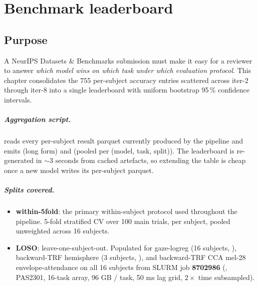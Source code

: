 \chapter{Benchmark leaderboard}
\label{ch:benchmark}

\section{Purpose}

A NeurIPS Datasets \& Benchmarks submission must make it easy for a
reviewer to answer \emph{which model wins on which task under which
evaluation protocol}. This chapter consolidates the 755 per-subject
accuracy entries scattered across iter-2 through iter-8 into a single
leaderboard with uniform bootstrap 95\,\% confidence intervals.

\paragraph{Aggregation script.}
 reads every
per-subject result parquet currently produced by the pipeline and emits
 (long form) and
 (pooled per
(model, task, split)). The leaderboard is re-generated in $\sim 3$
seconds from cached artefacts, so extending the table is cheap once a
new model writes its per-subject parquet.

\paragraph{Splits covered.}
\begin{itemize}
  \item \textbf{within-5fold}: the primary within-subject protocol used
        throughout the pipeline. 5-fold stratified CV over 100 main
        trials, per subject, pooled unweighted across 16 subjects.
  \item \textbf{LOSO}: leave-one-subject-out. Populated for gaze-logreg
        (16 subjects, ), backward-TRF
        hemisphere (3 subjects, ), and
        backward-TRF CCA mel-28 envelope-attendance on all 16 subjects
        from SLURM job \textbf{8702986} (,
        PAS2301, 16-task array, 96 GB / task, 50 ms lag grid, $2\times$
        time subsampled).
\end{itemize}

